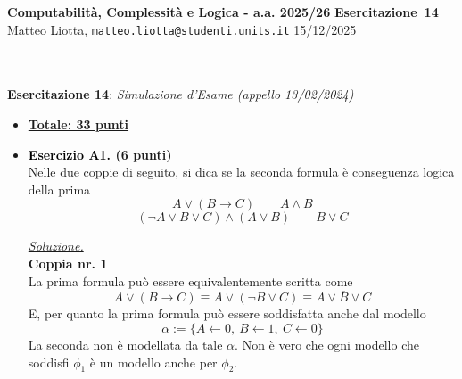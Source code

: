 \documentclass[a4paper,10pt]{article}
\makeatletter
\newcommand{\EsercitazioneNum}{14}
\newcommand{\Data}{15/12/2025}
\newcommand{\DocType}{Esercitazione} %
\newcommand{\FullTitle}{\DocType\ \EsercitazioneNum}
\newcommand{\Header}{
\noindent
  \small \textbf{Computabilità, Complessità e Logica - a.a. 2025/26} \hfill \textbf{\FullTitle} \\[0.2cm]
  \scriptsize Matteo Liotta, \texttt{matteo.liotta@studenti.units.it} \hfill \Data \\[0.2cm]
  \noindent\makebox[\linewidth]{\rule{\linewidth}{0.4pt}} \\[0.3cm]}
\makeatother
\begin{document}
\footnotesize  %
\Header\\[0.7cm]



    
    
    \noindent\Large \textbf{Esercitazione 14}: \textit{Simulazione d'Esame (appello 13/02/2024)} 
    
    {\normalsize
    \begin{itemize}[label=, leftmargin=0pt]
    

    
    

    \item \textbf{\underline{Totale: 33 punti}}\\[0.1cm]
    
    \item \textbf{\textcolor{black}{Esercizio A1.} (6 punti)} \\ 	
    Nelle due coppie di seguito, si dica se la seconda formula è conseguenza logica della prima
    $$A\lor (B\rightarrow C) \quad \quad A\land B$$
    $$ (\lnot A\lor B\lor C) \land (A\lor B)\quad \quad B\lor C$$

    \begin{osservazioni}
    \underline{\textit{Soluzione.}}\\
    \textbf{Coppia nr. 1}\\
    La prima formula può essere equivalentemente scritta come
    $$A\lor (B\rightarrow C)\equiv A\lor (\lnot B\lor C)\equiv A\lor \overline B\lor C$$
    E, per quanto la prima formula può essere soddisfatta anche dal modello $$\alpha:=\{A\leftarrow 0,\ B\leftarrow1,\ C\leftarrow0\}$$
    La seconda non è modellata da tale $\alpha$. Non è vero che ogni modello che soddisfi $\phi_1$ è un modello anche per $\phi_2$.\\[0.2cm]


\end{osservazioni}
\end{itemize}}
\end{document}
